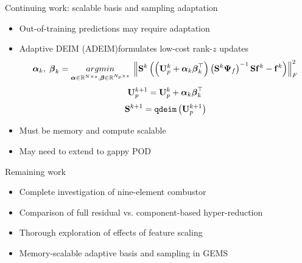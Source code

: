 \documentclass[]{beamer}
\begin{document}
\begin{frame}{Continuing work: scalable basis and sampling adaptation}
	\begin{itemize}
		\item Out-of-training predictions may require adaptation
		\item Adaptive DEIM (ADEIM)\footnotemark[18] formulates low-cost rank-$z$ updates
		\small
		\begin{equation*}
			\boldsymbol{\alpha}_{\newtonIdx}, \; \boldsymbol{\beta}_{\newtonIdx} = \argmin{\boldsymbol{\alpha} \in \mathbb{R}^{\numDOF \times z}, \boldsymbol{\beta} \in \mathbb{R}^{\numPrimModes \times z}} \norm{\sampMat^{\newtonIdx} \left( \left( \primTrial^{\newtonIdx} + \boldsymbol{\alpha}_{\newtonIdx} \boldsymbol{\beta}_{\newtonIdx}^\top \right) \left(\sampMat^{\newtonIdx} \deimBasisRhs\right)^{-1} \sampMat \rhsDataMat^{\newtonIdx} - \rhsDataMat^{\newtonIdx} \right)}_F^2
		\end{equation*}
		\normalsize
		\begin{equation*}
			\primTrial^{\newtonIdx + 1} = \primTrial^{\newtonIdx} + \boldsymbol{\alpha}_{\newtonIdx} \boldsymbol{\beta}_{\newtonIdx}^\top
		\end{equation*}
		\begin{equation*}
			\sampMat^{\newtonIdx+1} = \texttt{qdeim}\left( \primTrial^{\newtonIdx + 1} \right)
		\end{equation*}
		\item Must be memory and compute scalable
		\item May need to extend to gappy POD
	\end{itemize}
\end{frame}

\begin{frame}{Remaining work}
	\begin{itemize}
		\item Complete investigation of nine-element combustor
		\item Comparison of full residual vs. component-based hyper-reduction
		\item Thorough exploration of effects of feature scaling
		\item Memory-scalable adaptive basis and sampling in GEMS
	\end{itemize}
\end{frame}
\end{document}
